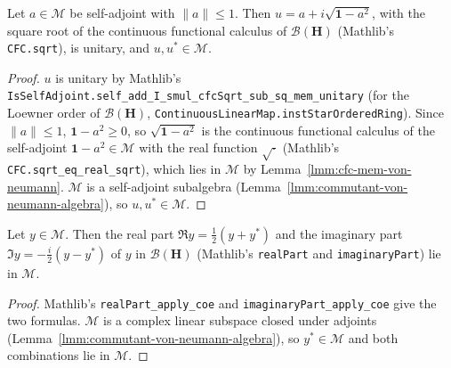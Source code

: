 \begin{lemma}
    \label{lmm:von-neumann-unitary-of-contraction}
    \leanok
    Let $a \in \mathcal{M}$ be self-adjoint with $\|a\| \le 1$. Then $u = a + i\sqrt{\mathbf{1} - a^2}$, with the square root of the continuous functional calculus of $\mathcal{B}(\mathbf{H})$ (Mathlib's \texttt{CFC.sqrt}), is unitary, and $u, u^* \in \mathcal{M}$.
\end{lemma}
\begin{proof}
    \leanok
    $u$ is unitary by Mathlib's \texttt{IsSelfAdjoint.self\_add\_I\_smul\_cfcSqrt\_sub\_sq\_mem\_unitary} (for the Loewner order of $\mathcal{B}(\mathbf{H})$, \texttt{ContinuousLinearMap.instStarOrderedRing}). Since $\|a\| \le 1$, $\mathbf{1} - a^2 \ge 0$, so $\sqrt{\mathbf{1} - a^2}$ is the continuous functional calculus of the self-adjoint $\mathbf{1} - a^2 \in \mathcal{M}$ with the real function $\sqrt{\cdot}$ (Mathlib's \texttt{CFC.sqrt\_eq\_real\_sqrt}), which lies in $\mathcal{M}$ by Lemma~\ref{lmm:cfc-mem-von-neumann}. $\mathcal{M}$ is a self-adjoint subalgebra (Lemma~\ref{lmm:commutant-von-neumann-algebra}), so $u, u^* \in \mathcal{M}$.
\end{proof}

\begin{lemma}
    \label{lmm:von-neumann-real-imaginary-part}
    \leanok
    Let $y \in \mathcal{M}$. Then the real part $\Re y = \tfrac{1}{2}(y + y^*)$ and the imaginary part $\Im y = -\tfrac{i}{2}(y - y^*)$ of $y$ in $\mathcal{B}(\mathbf{H})$ (Mathlib's \texttt{realPart} and \texttt{imaginaryPart}) lie in $\mathcal{M}$.
\end{lemma}
\begin{proof}
    \leanok
    Mathlib's \texttt{realPart\_apply\_coe} and \texttt{imaginaryPart\_apply\_coe} give the two formulas. $\mathcal{M}$ is a complex linear subspace closed under adjoints (Lemma~\ref{lmm:commutant-von-neumann-algebra}), so $y^* \in \mathcal{M}$ and both combinations lie in $\mathcal{M}$.
\end{proof}

